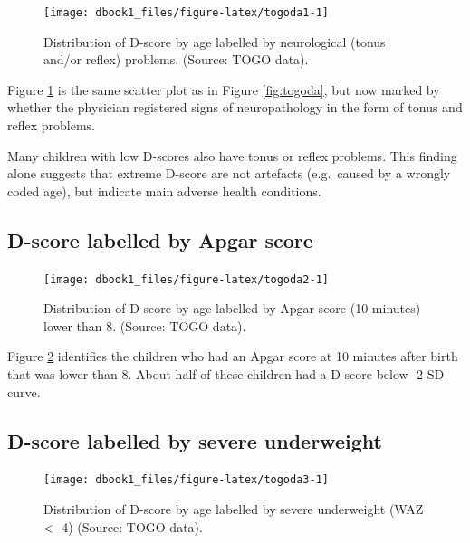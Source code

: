\documentclass[
]{book}
\begin{document}
\begin{figure}

{\centering \texttt{[image: dbook1\_files/figure-latex/togoda1-1]} 

}

\caption{Distribution of D-score by age labelled by neurological (tonus and/or reflex) problems. (Source: TOGO data).}\label{fig:togoda1}
\end{figure}



Figure \ref{fig:togoda1} is the same scatter plot as in Figure \ref{fig:togoda}, but now marked by whether the physician registered signs of neuropathology in the form of tonus and reflex problems.

Many children with low D-scores also have tonus or reflex problems. This finding alone suggests that extreme D-score are not artefacts (e.g.~caused by a wrongly coded age), but indicate main adverse health conditions.

\hypertarget{d-score-labelled-by-apgar-score}{%
\subsection{D-score labelled by Apgar score}\label{d-score-labelled-by-apgar-score}}

\begin{figure}

{\centering \texttt{[image: dbook1\_files/figure-latex/togoda2-1]} 

}

\caption{Distribution of D-score by age labelled by Apgar score (10 minutes) lower than 8. (Source: TOGO data).}\label{fig:togoda2}
\end{figure}



Figure \ref{fig:togoda2} identifies the children who had an Apgar score at 10 minutes after birth that was lower than 8. About half of these children had a D-score below -2 SD curve.

\hypertarget{d-score-labelled-by-severe-underweight}{%
\subsection{D-score labelled by severe underweight}\label{d-score-labelled-by-severe-underweight}}

\begin{figure}

{\centering \texttt{[image: dbook1\_files/figure-latex/togoda3-1]} 

}

\caption{Distribution of D-score by age labelled by severe underweight (WAZ \textless{} -4) (Source: TOGO data).}\label{fig:togoda3}
\end{figure}
\end{document}
